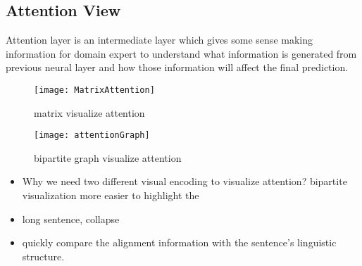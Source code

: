 \subsection{Attention View}
Attention layer is an intermediate layer which gives some sense making information for domain expert to understand what information is generated from previous neural layer and how those information will affect the final prediction.

\begin{figure}[htbp]
	\centering
	\vspace{-2mm}
	\texttt{[image: MatrixAttention]}
	\caption{matrix visualize attention}
	\label{fig:MatrixAttention}
\end{figure}


\begin{figure}[htbp]
	\centering
	\vspace{-2mm}
	\texttt{[image: attentionGraph]}
	\caption{bipartite graph visualize attention}
	\label{fig:attentionGraph}
\end{figure}

\begin{itemize}
	\item Why we need two different visual encoding to visualize attention? bipartite visualization more easier to highlight the 
	\item long sentence, collapse
	\item quickly compare the alignment information with the sentence's linguistic structure.
\end{itemize}


